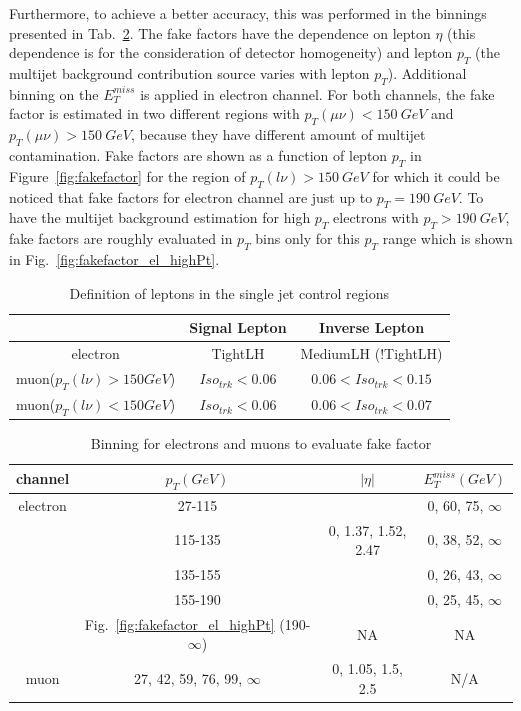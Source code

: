 Furthermore, to achieve a better accuracy, this was performed in the binnings presented in Tab.~\ref{tab:FFBinning}. The fake factors have the dependence on lepton $\eta$ (this dependence is for the consideration of detector homogeneity) and lepton $p_{T}$ (the multijet background contribution source varies with lepton $p_{T}$). Additional binning on the $E_{T}^{miss}$ is applied in electron channel. For both channels, the fake factor is estimated in two different regions with $p_{T}(\mu\nu)<150~GeV$ and $p_{T}(\mu\nu)>150~GeV$, because they have different amount of multijet contamination. Fake factors are shown as a function of lepton $p_{T}$ in Figure~\ref{fig:fakefactor} for the region of $p_{T}(l\nu)>150~GeV$ for which it could be noticed that fake factors for electron channel are just up to $p_{T}=190~GeV$. To have the multijet background estimation for high $p_T$ electrons with $p_{T}>190~GeV$, fake factors are roughly evaluated in $p_{T}$ bins only for this $p_T$ range which is shown in Fig.~\ref{fig:fakefactor_el_highPt}.
\begin{table}[h]
  \caption{Definition of leptons in the single jet control regions} \label{tab:LepIsoCR}
  \begin{center}

    \begin{tabular}{ | c | c | c | }
     \hline
                               &  Signal Lepton  & Inverse Lepton \\ \hline
    electron                   &        TightLH        & MediumLH (!TightLH) \\ \hline
    muon($p_{T}(l\nu)>150 GeV$) &  $Iso_{trk}<0.06$    & $0.06<Iso_{trk}<0.15$ \\ \hline
    muon($p_{T}(l\nu)<150 GeV$) &  $Iso_{trk}<0.06$    & $0.06<Iso_{trk}<0.07$ \\ \hline
\end{tabular}
\end{center}
\end{table}


\begin{table}[h]
  \caption{Binning for electrons and muons to evaluate fake factor} \label{tab:FFBinning}
\begin{center}

\begin{tabular}{ | c | c | c | c |}
    \hline
    channel  & $p_{T}(GeV)$ & $|\eta|$ & $E_{T}^{miss}(GeV)$ \\ \hline
    electron & 27-115 &  & 0, 60, 75, $\infty$ \\
             & 115-135&0, 1.37, 1.52, 2.47 & 0, 38, 52, $\infty$ \\
             & 135-155& & 0, 26, 43, $\infty$ \\
             & 155-190& & 0, 25, 45, $\infty$ \\ \cline{2-4}
             & Fig.~\ref{fig:fakefactor_el_highPt} (190-$\infty$) & NA & NA  \\\hline
    muon     & 27, 42, 59, 76, 99, $\infty$ & 0, 1.05, 1.5, 2.5 & N/A \\ \hline

\end{tabular}
\end{center}
\end{table}

